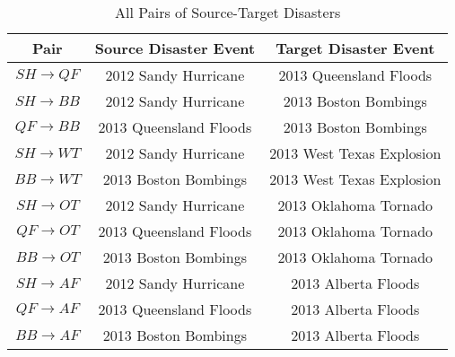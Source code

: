 \begin{table}[ht]
    \begin{center}
    \caption{All Pairs of Source-Target Disasters}
    \begin{tabular}[c]{|c|c|c|}
        \hline
        Pair & Source Disaster Event & Target Disaster Event  \\
        \hline
        $SH \rightarrow QF$ & 2012 Sandy Hurricane & 2013 Queensland Floods \\

        $SH \rightarrow BB$ & 2012 Sandy Hurricane & 2013 Boston Bombings \\
        $QF \rightarrow BB$ & 2013 Queensland Floods & 2013 Boston Bombings \\

        $SH \rightarrow WT$ & 2012 Sandy Hurricane & 2013 West Texas Explosion \\
        $BB \rightarrow WT$ & 2013 Boston Bombings & 2013 West Texas Explosion \\

        $SH \rightarrow OT$ & 2012 Sandy Hurricane & 2013 Oklahoma Tornado \\
        $QF \rightarrow OT$ & 2013 Queensland Floods & 2013 Oklahoma Tornado \\
        $BB \rightarrow OT$ & 2013 Boston Bombings & 2013 Oklahoma Tornado  \\

        $SH \rightarrow AF$ & 2012 Sandy Hurricane & 2013 Alberta Floods \\
        $QF \rightarrow AF$ & 2013 Queensland Floods & 2013 Alberta Floods \\
        $BB \rightarrow AF$ & 2013 Boston Bombings & 2013 Alberta Floods \\
        \hline
    \end{tabular}
    \label{tableadddata}
   \end{center}
\end{table}



